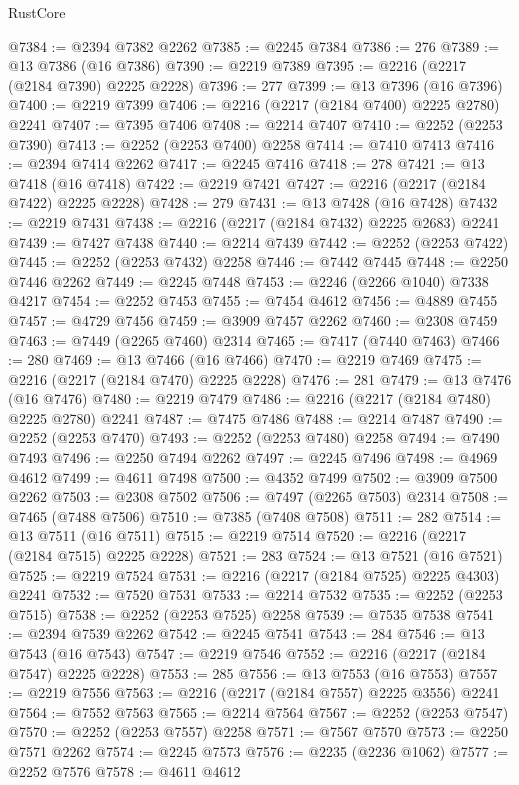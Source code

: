 \begin{lexlean}{RustCore}
\begin{coremodule}
@7384 := @2394 @7382 @2262
@7385 := @2245 @7384
@7386 := 276
@7389 := @13 @7386 (@16 @7386)
@7390 := @2219 @7389
@7395 := @2216 (@2217 (@2184 @7390) @2225 @2228)
@7396 := 277
@7399 := @13 @7396 (@16 @7396)
@7400 := @2219 @7399
@7406 := @2216 (@2217 (@2184 @7400) @2225 @2780) @2241
@7407 := @7395 @7406
@7408 := @2214 @7407
@7410 := @2252 (@2253 @7390)
@7413 := @2252 (@2253 @7400) @2258
@7414 := @7410 @7413
@7416 := @2394 @7414 @2262
@7417 := @2245 @7416
@7418 := 278
@7421 := @13 @7418 (@16 @7418)
@7422 := @2219 @7421
@7427 := @2216 (@2217 (@2184 @7422) @2225 @2228)
@7428 := 279
@7431 := @13 @7428 (@16 @7428)
@7432 := @2219 @7431
@7438 := @2216 (@2217 (@2184 @7432) @2225 @2683) @2241
@7439 := @7427 @7438
@7440 := @2214 @7439
@7442 := @2252 (@2253 @7422)
@7445 := @2252 (@2253 @7432) @2258
@7446 := @7442 @7445
@7448 := @2250 @7446 @2262
@7449 := @2245 @7448
@7453 := @2246 (@2266 @1040) @7338 @4217
@7454 := @2252 @7453
@7455 := @7454 @4612
@7456 := @4889 @7455
@7457 := @4729 @7456
@7459 := @3909 @7457 @2262
@7460 := @2308 @7459
@7463 := @7449 (@2265 @7460) @2314
@7465 := @7417 (@7440 @7463)
@7466 := 280
@7469 := @13 @7466 (@16 @7466)
@7470 := @2219 @7469
@7475 := @2216 (@2217 (@2184 @7470) @2225 @2228)
@7476 := 281
@7479 := @13 @7476 (@16 @7476)
@7480 := @2219 @7479
@7486 := @2216 (@2217 (@2184 @7480) @2225 @2780) @2241
@7487 := @7475 @7486
@7488 := @2214 @7487
@7490 := @2252 (@2253 @7470)
@7493 := @2252 (@2253 @7480) @2258
@7494 := @7490 @7493
@7496 := @2250 @7494 @2262
@7497 := @2245 @7496
@7498 := @4969 @4612
@7499 := @4611 @7498
@7500 := @4352 @7499
@7502 := @3909 @7500 @2262
@7503 := @2308 @7502
@7506 := @7497 (@2265 @7503) @2314
@7508 := @7465 (@7488 @7506)
@7510 := @7385 (@7408 @7508)
@7511 := 282
@7514 := @13 @7511 (@16 @7511)
@7515 := @2219 @7514
@7520 := @2216 (@2217 (@2184 @7515) @2225 @2228)
@7521 := 283
@7524 := @13 @7521 (@16 @7521)
@7525 := @2219 @7524
@7531 := @2216 (@2217 (@2184 @7525) @2225 @4303) @2241
@7532 := @7520 @7531
@7533 := @2214 @7532
@7535 := @2252 (@2253 @7515)
@7538 := @2252 (@2253 @7525) @2258
@7539 := @7535 @7538
@7541 := @2394 @7539 @2262
@7542 := @2245 @7541
@7543 := 284
@7546 := @13 @7543 (@16 @7543)
@7547 := @2219 @7546
@7552 := @2216 (@2217 (@2184 @7547) @2225 @2228)
@7553 := 285
@7556 := @13 @7553 (@16 @7553)
@7557 := @2219 @7556
@7563 := @2216 (@2217 (@2184 @7557) @2225 @3556) @2241
@7564 := @7552 @7563
@7565 := @2214 @7564
@7567 := @2252 (@2253 @7547)
@7570 := @2252 (@2253 @7557) @2258
@7571 := @7567 @7570
@7573 := @2250 @7571 @2262
@7574 := @2245 @7573
@7576 := @2235 (@2236 @1062)
@7577 := @2252 @7576
@7578 := @4611 @4612

\end{coremodule}
\end{lexlean}
